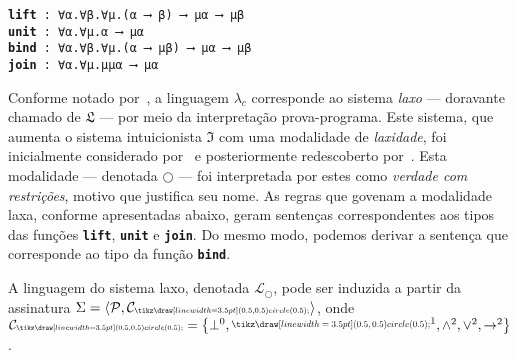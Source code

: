 \vspace{.5\baselineskip}
\begin{tcolorbox}[enhanced jigsaw, breakable, sharp corners, colframe=black, colback=white, boxrule=0.5pt, left=1.5mm, right=1.5mm, top=1.5mm, bottom=1.5mm]
    \texttt{\footnotesize\textbf{lift} : ∀α.∀β.∀μ.(α ⟶ β) ⟶ μα ⟶ μβ}\\
    \texttt{\footnotesize\textbf{unit} : ∀α.∀μ.α ⟶ μα}\\
    \texttt{\footnotesize\textbf{bind} : ∀α.∀β.∀μ.(α ⟶ μβ) ⟶ μα ⟶ μβ}\\
        \texttt{\footnotesize\textbf{join} : ∀α.∀μ.μμα ⟶ μα}
\end{tcolorbox}

\vspace{.5\baselineskip}
Conforme notado por~\cite{Benton}, a linguagem $\lambda_c$ corresponde ao sistema \emph{laxo} --- doravante chamado de $\mathfrak{L}$ --- por meio da interpretação prova-programa.
Este sistema, que aumenta o sistema intuicionista $\mathfrak{I}$ com uma modalidade de \emph{laxidade}, foi inicialmente considerado por~\cite{Curry-A} e posteriormente redescoberto por~\cite{Fairtlough}.
Esta modalidade --- denotada $\bigcirc$ --- foi interpretada por estes como \emph{verdade com restrições}, motivo que justifica seu nome.
As regras que govenam a modalidade laxa, conforme    apresentadas abaixo, geram sentenças correspondentes aos tipos das funções {\footnotesize\texttt{\textbf{lift}}}, {\footnotesize\texttt{\textbf{unit}}} e {\footnotesize\texttt{\textbf{join}}}.
Do mesmo modo, podemos derivar a sentença que corresponde ao tipo da função {\footnotesize\texttt{\textbf{bind}}}.

\vspace{.5\baselineskip}
\begin{tcolorbox}[enhanced jigsaw, breakable, sharp corners, colframe=black, colback=white, boxrule=0.5pt, left=1.5mm, right=1.5mm, top=1.5mm, bottom=1.5mm]
\begin{definition}\label{lax.language}
    A linguagem do sistema laxo, denotada $\mathcal{L}_\bigcirc$, pode ser induzida a partir da assinatura $\Sigma=\sequence{\mathcal{P},\mathcal{C}_\bigcirc}$, onde $\mathcal{C}_\bigcirc=\set{\bot^0,\bigcirc^1,\wedge^2,\vee^2,\to^2}$.
\end{definition}
\end{tcolorbox}

